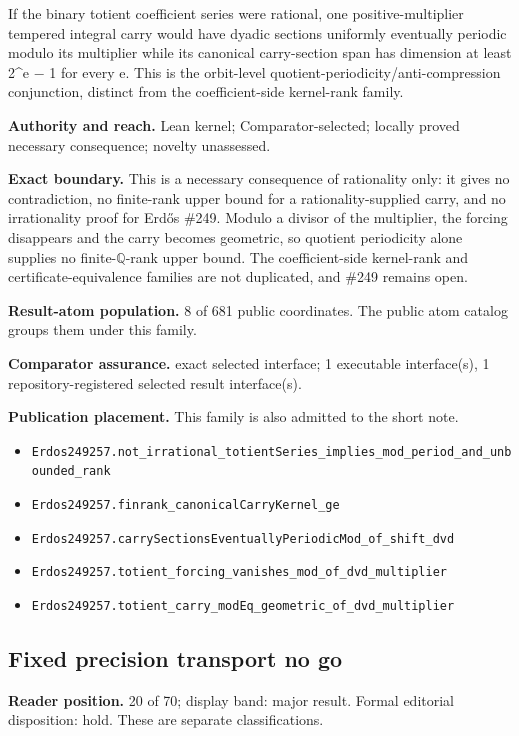 If the binary totient coefficient series were rational, one positive-multiplier tempered integral carry would have dyadic sections uniformly eventually periodic modulo its multiplier while its canonical carry-section span has dimension at least 2\textasciicircum{}e \ensuremath{-} 1 for every e. This is the orbit-level quotient-periodicity/anti-compression conjunction, distinct from the coefficient-side kernel-rank family.

\textbf{Authority and reach.} Lean kernel; Comparator-selected; locally proved necessary consequence; novelty unassessed.

\textbf{Exact boundary.} This is a necessary consequence of rationality only: it gives no contradiction, no finite-rank upper bound for a rationality-supplied carry, and no irrationality proof for Erdős \#249. Modulo a divisor of the multiplier, the forcing disappears and the carry becomes geometric, so quotient periodicity alone supplies no finite-\ensuremath{\mathbb{Q}}-rank upper bound. The coefficient-side kernel-rank and certificate-equivalence families are not duplicated, and \#249 remains open.

\textbf{Result-atom population.} 8 of 681 public coordinates. The public atom catalog groups them under this family.

\textbf{Comparator assurance.} exact selected interface; 1 executable interface(s), 1 repository-registered selected result interface(s).

\textbf{Publication placement.} This family is also admitted to the short note.

\begin{itemize}
  \item \nolinkurl{Erdos249257.not_irrational_totientSeries_implies_mod_period_and_unbounded_rank}
  \item \nolinkurl{Erdos249257.finrank_canonicalCarryKernel_ge}
  \item \nolinkurl{Erdos249257.carrySectionsEventuallyPeriodicMod_of_shift_dvd}
  \item \nolinkurl{Erdos249257.totient_forcing_vanishes_mod_of_dvd_multiplier}
  \item \nolinkurl{Erdos249257.totient_carry_modEq_geometric_of_dvd_multiplier}
\end{itemize}

\subsection{Fixed precision transport no go}
\textbf{Reader position.} 20 of 70; display band: major result.  Formal editorial disposition: hold.  These are separate classifications.

